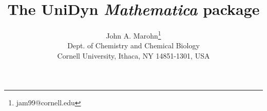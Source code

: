 \documentclass[12pt,letterpaper]{refart}
\begin{document}
\sloppy

\title{The UniDyn \emph{Mathematica} package}
\author{
	John A. Marohn\thanks{jam99@cornell.edu} \\ 
	{\footnotesize Dept. of Chemistry and Chemical Biology} \\ 
	{\footnotesize Cornell University, Ithaca, NY 14851-1301, USA}
}
\maketitle

\begin{abstract}
  
\end{abstract}

\pagestyle{fancy}  %

	\cfoot{\thepage}
	
\end{document}
